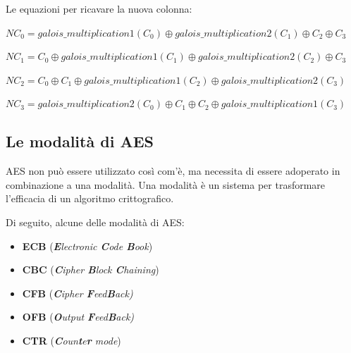 \textsf{\small Le equazioni per ricavare la nuova colonna: }

\textsf{\small $ NC_0 = galois\_multiplication 1 (C_0) \oplus galois\_multiplication 2 (C_1) \oplus C_2 \oplus C_3 $}

\textsf{\small $ NC_1 = C_0 \oplus galois\_multiplication 1 (C_1) \oplus galois\_multiplication 2 (C_2) \oplus C_3 $}

\textsf{\small $ NC_2 = C_0 \oplus C_1 \oplus galois\_multiplication 1 (C_2) \oplus galois\_multiplication 2 (C_3) $ }

\textsf{\small $ NC_3 = galois\_multiplication 2 (C_0) \oplus C_1 \oplus C_2 \oplus galois\_multiplication 1 (C_3) $}

\subsection{Le modalità di AES}

 

\textsf{\small AES non può essere utilizzato così com'è, ma necessita di essere adoperato in combinazione a una modalità. } %
\textsf{\small Una modalità è un sistema per trasformare l'efficacia di un algoritmo crittografico.} %

     

\textsf{\small Di seguito, alcune delle modalità di AES: }

\begin{itemize}
	\item \textsf{\small \textbf{ECB} (\emph{\textbf{E}lectronic \textbf{C}ode \textbf{B}ook})}
	\item \textsf{\small \textbf{CBC} (\emph{\textbf{C}ipher \textbf{B}lock \textbf{C}haining})}
	\item \textsf{\small \textbf{CFB} (\emph{\textbf{C}ipher \textbf{F}eed\textbf{B}ack)}}
	\item \textsf{\small \textbf{OFB} (\emph{\textbf{O}utput \textbf{F}eed\textbf{B}ack)}}
	\item \textsf{\small \textbf{CTR} (\emph{\textbf{C}oun\textbf{t}e\textbf{r} mode})}
\end{itemize} 

